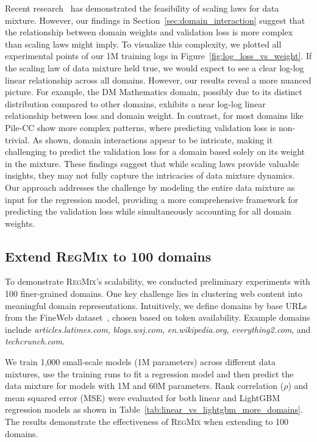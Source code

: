 \documentclass{article}
\theoremstyle{definition}
\theoremstyle{remark}
\newcommand{\ourmethod}{\textsc{RegMix}\xspace}
\begin{document}
Recent research~\citep{ye2024datamixing,ge2024data} has demonstrated the feasibility of scaling laws for data mixture.
However, our findings in Section~\ref{sec:domain_interaction} suggest that the relationship between domain weights and validation loss is more complex than scaling laws might imply.
To visualize this complexity, we plotted all experimental points of our 1M training logs in Figure~\ref{fig:log_loss_vs_weight}.
If the scaling law of data mixture held true, we would expect to see a clear log-log linear relationship across all domains.
However, our results reveal a more nuanced picture.
For example, the DM Mathematics domain, possibly due to its distinct distribution compared to other domains, exhibits a near log-log linear relationship between loss and domain weight.
In contrast, for most domains like Pile-CC show more complex patterns, where predicting validation loss is non-trivial.
As shown, domain interactions appear to be intricate, making it challenging to predict the validation loss for a domain based solely on its weight in the mixture.
These findings suggest that while scaling laws provide valuable insights, they may not fully capture the intricacies of data mixture dynamics.
Our approach addresses the challenge by modeling the entire data mixture as input for the regression model, providing a more comprehensive framework for predicting the validation loss while simultaneously accounting for all domain weights.

\subsection{Extend \ourmethod to 100 domains}

To demonstrate \ourmethod's scalability, we conducted preliminary experiments with 100 finer-grained domains. 
One key challenge lies in clustering web content into meaningful domain representations.
Intuitively, we define domains by base URLs from the FineWeb dataset~\citep{penedo2024fineweb}, chosen based on token availability. 
Example domains include \textit{articles.latimes.com}, \textit{blogs.wsj.com}, \textit{en.wikipedia.org}, \textit{everything2.com}, and \textit{techcrunch.com}. 

We train 1,000 small-scale models (1M parameters) across different data mixtures, use the training runs to fit a regression model and then predict the data mixture for models with 1M and 60M parameters. 
Rank correlation ($\rho$) and mean squared error (MSE) were evaluated for both linear and LightGBM regression models as shown in Table~\ref{tab:linear_vs_lightgbm_more_domains}.
The results demonstrate the effectiveness of \ourmethod when extending to 100 domains.
\end{document}
